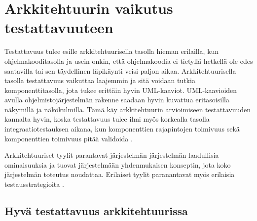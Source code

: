 \documentclass[finnish]{tktltiki2}
\theoremstyle{definition}
\theoremstyle{remark}
\begin{document}




\section{Arkkitehtuurin vaikutus testattavuuteen}

Testattavuus tulee esille arkkitehtuurisella tasolla hieman erilailla, kun ohjelmakooditasolla ja usein onkin, että ohjelmakoodia ei tietyllä hetkellä ole edes saatavilla tai sen täydellinen läpikäynti veisi paljon aikaa. Arkkitehtuurisella tasolla testattavuus vaikuttaa laajemmin ja sitä voidaan tutkia komponenttitasolla, jota tukee erittäin hyvin UML-kaaviot. UML-kaavioiden avulla ohjelmistojärjestelmän rakenne saadaan hyvin kuvattua eritasoisilla näkymillä ja näkökulmilla. Tämä käy arkkitehtuurin arvioimiseen testattavuuden kannalta hyvin, koska testattavuus tulee ilmi myös korkealla tasolla integraatiotestauksen aikana, kun komponenttien rajapintojen toimivuus sekä komponenttien toimivuus pitää validoida \citep[s. 65]{Eickelmann:1996:MOS:243327.243602}.


Arkkitehtuuriset tyylit parantavat järjestelmän järjestelmän laadullisia ominaisuuksia ja tuovat järjestelmään yhdenmukaisen konseptin, jota koko järjestelmän toteutus noudattaa. Erilaiset tyylit paranantavat myös erilaisia testausstrategioita \citep[s. 66]{Eickelmann:1996:MOS:243327.243602}. 

\subsection{Hyvä testattavuus arkkitehtuurissa}
\end{document}
